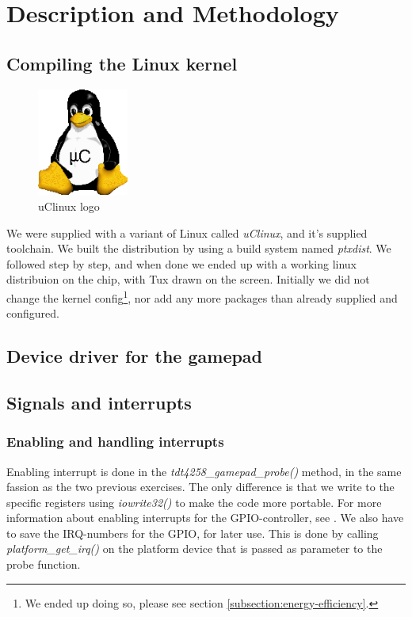 \section{Description and Methodology}

\subsection{Compiling the Linux kernel}
\begin{figure}[h]
	\centering
	\includegraphics[width=3cm]{img/uclinux.png}
	\caption{uClinux logo}
	\label{fig:uclinux}
\end{figure}
We were supplied with a variant of Linux called \emph{uClinux}, and it's supplied toolchain. We built the distribution by using a build system named \emph{ptxdist}. We followed \cite[section 5.3]{compendium} step by step, and when done we ended up with a working linux distribuion on the chip, with Tux drawn on the screen. Initially we did not change the kernel config\footnote{We ended up doing so, please see section \ref{subsection:energy-efficiency}.}, nor add any more packages than already supplied and configured.

\subsection{Device driver for the gamepad}

\subsection{Signals and interrupts}
\label{subsection:signals-and-interrupts}
\subsubsection{Enabling and handling interrupts}

Enabling interrupt is done in the \emph{tdt4258\_gamepad\_probe()} method, in the same fassion as the two previous exercises. The only difference is that we write to the specific registers using \emph{iowrite32()} to make the code more portable. For more information about enabling interrupts for the GPIO-controller, see \cite[section 3]{compendium}. We also have to save the IRQ-numbers for the GPIO, for later use. This is done by calling \emph{platform\_get\_irq()} on the platform device that is passed as parameter to the probe function.\\

